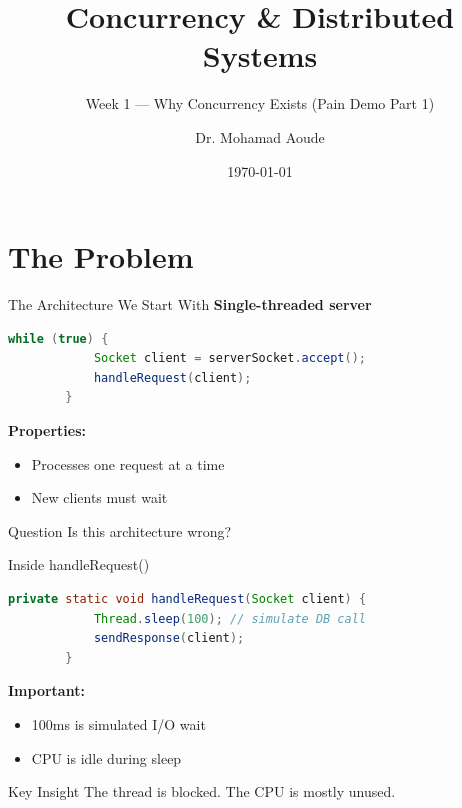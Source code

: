 \documentclass[11pt]{beamer}
\title{Concurrency \& Distributed Systems}
\subtitle{Week 1 --- Why Concurrency Exists (Pain Demo Part 1)}
\author{Dr. Mohamad Aoude}
\institute{Lebanese University \\ Faculty of Engineering}
\date{\today}
\begin{document}
	
	\begin{frame}
		\titlepage
	\end{frame}
	
	\section{The Problem}
	
	\begin{frame}[fragile]{The Architecture We Start With}
	\textbf{Single-threaded server}
		
	\begin{lstlisting}[language=Java]
		while (true) {
			Socket client = serverSocket.accept();
			handleRequest(client);
		}
	\end{lstlisting}

		
		\textbf{Properties:}
		\begin{itemize}
			\item Processes one request at a time
			\item New clients must wait
		\end{itemize}
		

		
		\begin{block}{Question}
			Is this architecture wrong?
		\end{block}
	\end{frame}
	
	\begin{frame}[fragile]{Inside handleRequest()}
	\begin{lstlisting}[language=Java]
		private static void handleRequest(Socket client) {
			Thread.sleep(100); // simulate DB call
			sendResponse(client);
		}
	\end{lstlisting}
		

		
		\textbf{Important:}
		\begin{itemize}
			\item 100ms is simulated I/O wait
			\item CPU is idle during sleep
		\end{itemize}
		

		
		\begin{alertblock}{Key Insight}
			The thread is blocked. The CPU is mostly unused.
		\end{alertblock}
	\end{frame}
	
\end{document}
